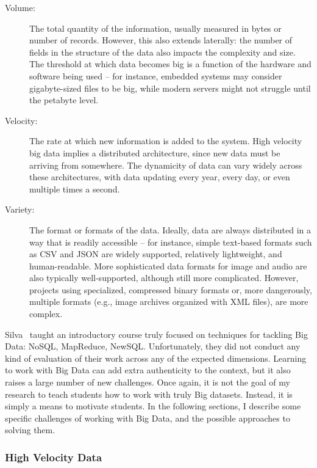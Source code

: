 \begin{description}
	\item[Volume:] The total quantity of the information, usually measured in bytes or number of records. However, this also extends laterally: the number of fields in the structure of the data also impacts the complexity and size. The threshold at which data becomes big is a function of the hardware and software being used -- for instance, embedded systems may consider gigabyte-sized files to be big, while modern servers might not struggle until the petabyte level.
	\item[Velocity:] The rate at which new information is added to the system. High velocity big data implies a distributed architecture, since new data must be arriving from somewhere. The dynamicity of data can vary widely across these architectures, with data updating every year, every day, or even multiple times a second.
	\item[Variety:] The format or formats of the data. Ideally, data are always distributed in a way that is readily accessible -- for instance, simple text-based formats such as CSV and JSON are widely supported, relatively lightweight, and human-readable. More sophisticated data formats for image and audio are also typically well-supported, although still more complicated. However, projects using specialized, compressed binary formats or, more dangerously, multiple formats (e.g., image archives organized with XML files), are more complex.
\end{description}

Silva~\cite{Silva:2014} taught an introductory course truly focused on techniques for tackling Big Data: NoSQL, MapReduce, NewSQL.
Unfortunately, they did not conduct any kind of evaluation of their work across any of the expected dimensions. 
Learning to work with Big Data can add extra authenticity to the context, but it also raises a large number of new challenges.
Once again, it is not the goal of my research to teach students how to work with truly Big datasets. Instead, it is simply a means to motivate students.
In the following sections, I describe some specific challenges of working with Big Data, and the possible approaches to solving them.

\subsubsection{High Velocity Data}

